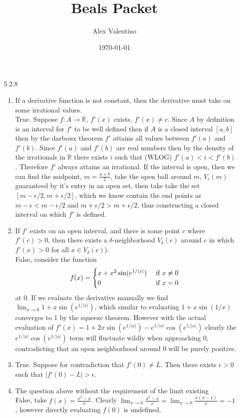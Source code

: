 \documentclass[12pt, letterpaper]{article}
\date{\today}
\author{Alex Valentino}
\title{Beals Packet}
\newcommand{\R}{\mathbb{R}}
\begin{document}
\begin{enumerate}
	\item[5.2.8]
	\begin{enumerate}
		\item If a derivative function is not constant, then the derivative must take on
some irrational values.\\
	True.  Suppose $f: A \to \R$, $f'(x)$ exists, $f'(x) \neq c$.  Since $A$ by 	 	definition is an interval for $f'$ to be well defined then if $A$ is a closed
	interval $[a,b]$ then by the darboux theorem $f'$ attains all values between
	$f'(a)$ and $f'(b)$.  Since $f'(a)$ and $f'(b)$ are real numbers then by the 
	density of the irrationals in $\R$ there exists $i$ such that (WLOG) 
	$f'(a) < i < f'(b)$.  Therefore $f'$ always attains an irrational.  
	If the interval is open, then we can find the midpoint, $m = \frac{a+b}{2}$,
	take the open ball around $m$, $V_\epsilon(m)$ guaranteed by it's entry in an open set, then take take the set $[m -\epsilon/2,m +\epsilon/2]$, which we know
	contain the end points as $m -\epsilon < m -\epsilon/2$ and $m + \epsilon/2 > m + \epsilon/2$, thus constructing a closed interval on which $f'$ is defined.
	\item If $f'$ exists on an open interval, and there is some point $c$ where $f'(c) > 0$, then there exists a $\delta$-neighborhood $V_\delta (c)$ around $c$ in which $f'(x) > 0$ for all
$x \in V_\delta (c)$).\\
False, consider the function \[f(x) = \begin{cases}
	x+x^2 \sin(e^{1/|x|}) & \text{ if $ x\neq 0$ }\\
	0 & \text{ if $ x = 0$ }
	\end{cases}	
	\] at 0.  If we evaluate the derivative manually we find 
	$\lim_{x \to 0} 1 + x \sin(e^{1/|x|})$, which similar to evaluating $1 + x\sin(1/x)$
	converges to 1 by the squeeze theorem.  However with the actual evaluation of 
	$f'(x) = 1 + 2x\sin(e^{1/|x|}) - e^{1/|x|}\cos(e^{1/|x|})$ clearly the  $e^{1/|x|}\cos(e^{1/|x|})$ 	term will fluctuate wildly when approaching 0, contradicting that an open neighborhood around $0$ will be purely positive.  
	\iffalse 
	True.  Suppose for contradiction that for all $\delta > 0$ there exists
	$x \in V_\delta(c)$ such that $f'(x) \leq 0$.  Therefore we may construct
	a sequence $(x_n) \to c$ where $f'(x_n) \leq 0$.  Thus by the algebraic
	limit theorem for functional limits since $f(x_n) \leq 0$ then $f'(c) \leq 0$.
	This is a contradiction as $f'(c) > 0$.  
	\fi
	\item True.  Suppose for contradiction that $f'(0) \neq L$.  Then there exists
	$\epsilon > 0$ such that $|f'(0) - L| > \epsilon$.   
	\item The question above without the requirement of the limit existing\\
	False, take $f(x) = \frac{x^2 - x}{x}$.  Clearly $\lim_{x\to 0} \frac{x^2 - x}{x} = \lim_{x\to 0} \frac{x(x-1)}{x} = -1$, however directly evaluating $f(0)$ is undefined.  
	  
	\end{enumerate}
\end{enumerate}
\end{document}
